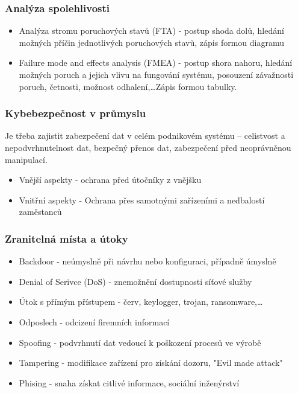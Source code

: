 \subsubsection*{Analýza spolehlivosti}
\begin{itemize}
    \item Analýza stromu poruchových stavů (FTA) - postup shoda dolů, hledání možných příčin jednotlivých poruchových stavů, zápis formou diagramu
    \item Failure mode and effects analysis (FMEA) - postup shora nahoru, hledání možných poruch a jejich vlivu na fungování systému, posouzení závažnosti poruch, četnosti, možnost odhalení,\dots Zápis formou tabulky.
\end{itemize}

\subsubsection*{Kybebezpečnost v průmyslu}
Je třeba zajistit zabezpečení dat v celém podnikovém systému – celistvost a nepodvrhnutelnost dat, bezpečný přenos dat, zabezpečení před neoprávněnou manipulací.
\begin{itemize}
    \item Vnější aspekty - ochrana před útočníky z vnějšku
    \item Vnitřní aspekty - Ochrana přes samotnými zařízeními a nedbalostí zaměstanců
\end{itemize}

\subsubsection*{Zranitelná místa a útoky}
\begin{itemize}
    \item Backdoor - neúmyslně při návrhu nebo konfiguraci, případně úmyslně
    \item Denial of Serivce (DoS) - znemožnění dostupnosti síťové služby
    \item Útok s přímým přístupem - červ, keylogger, trojan, ransomware,\dots
    \item Odposlech - odcizení firemních informací
    \item Spoofing - podvrhnutí dat vedoucí k poškození procesů ve výrobě
    \item Tampering - modifikace zařízení pro získání dozoru, "Evil made attack"
    \item Phising - snaha získat citlivé informace, sociální inženýrství
\end{itemize}

